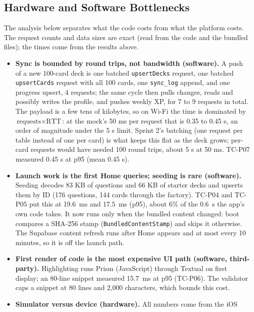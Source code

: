 \documentclass[12pt,letterpaper]{article}
\begin{document}
\subsection{Hardware and Software Bottlenecks}\label{sec:bottlenecks}
The analysis below separates what the code costs from what the platform costs. The
request counts and data sizes are exact (read from the code and the bundled files);
the times come from the results above.
\begin{itemize}
  \item \textbf{Sync is bounded by round trips, not bandwidth (software).} A push of a
        new 100-card deck is one batched \texttt{upsertDecks} request, one batched
        \texttt{upsertCards} request with all 100 cards, one \texttt{sync\_log}
        append, and one progress upsert, 4 requests; the same cycle then pulls
        changes, reads and possibly writes the profile, and pushes weekly XP, for 7 to
        9 requests in total. The payload is a few tens of kilobytes, so on Wi-Fi the
        time is dominated by $\text{requests} \times \text{RTT}$: at the mock's 50 ms
        per request that is 0.35 to 0.45 s, an order of magnitude under the 5 s
        limit. Sprint 2's batching
        (one request per table instead of one per card) is what keeps this flat as the
        deck grows; per-card requests would have needed 100 round trips, about 5 s at
        50 ms. TC-P07 measured 0.45 s at p95 (mean 0.45 s).
  \item \textbf{Launch work is the first Home queries; seeding is rare (software).}
        Seeding decodes 83 KB of questions and 66 KB of starter decks and upserts them
        by ID (176 questions, 144 cards through the factory). TC-P04 and TC-P05 put
        this at 19.6~ms and 17.5~ms (p95), about 6\% of the 0.6~s the app's own code
        takes. It now runs only when the bundled content changed: boot compares a
        SHA-256 stamp (\texttt{BundledContentStamp}) and skips it otherwise. The
        Supabase content refresh runs after Home appears and at most every 10 minutes,
        so it is off the launch path.
  \item \textbf{First render of code is the most expensive UI path (software,
        third-party).} Highlighting runs Prism (JavaScript) through Textual on first
        display; an 80-line snippet measured 15.7~ms at p95 (TC-P06). The validator caps a
        snippet at 80 lines and 2,000 characters, which bounds this cost.
  \item \textbf{Simulator versus device (hardware).} All numbers come from the iOS

\end{itemize}
\end{document}
